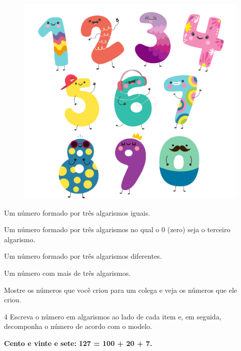 \begin{figure}[htpb!]
\centering
\includegraphics[width=.65\textwidth]{./media/image4a.png}
\end{figure}

\begin{escolha}
\item Um número formado por três algarismos iguais.\\

\item Um número formado por três algarismos no qual o 0 (zero) seja o terceiro algarismo.\\

\item Um número formado por três algarismos diferentes.\\

\item Um número com mais de três algarismos.\\

\item Mostre os números que você criou para um colega e veja os números que ele criou.
\end{escolha}

\num{4} Escreva o número em algarismos ao lado de cada item e, em seguida, decomponha o número de acordo com o modelo.

\begin{myquote}
\begin{center}
\textbf{Cento e vinte e sete:} \textbf{127 = 100 + 20 + 7.}
\end{center}
\end{myquote}

